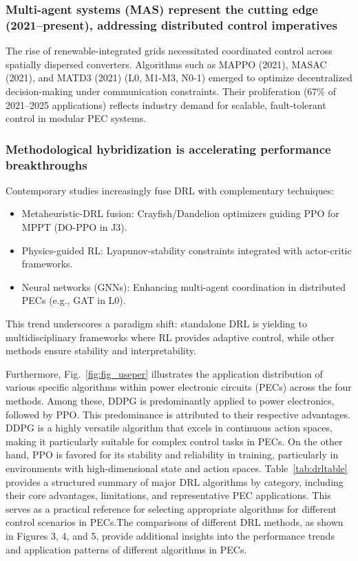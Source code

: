 \subsubsection{Multi-agent systems (MAS) represent the cutting edge (2021–present), addressing distributed control imperatives} The rise of renewable-integrated grids necessitated coordinated control across spatially dispersed converters. Algorithms such as MAPPO (2021), MASAC (2021), and MATD3 (2021) (L0, M1-M3, N0-1) emerged to optimize decentralized decision-making under communication constraints. Their proliferation (67\% of 2021–2025 applications) reflects industry demand for scalable, fault-tolerant control in modular PEC systems. 

\subsubsection{Methodological hybridization is accelerating performance breakthroughs} Contemporary studies increasingly fuse DRL with complementary techniques:
\begin{itemize}

  \item[$\bullet$] Metaheuristic-DRL fusion: Crayfish/Dandelion optimizers guiding PPO for MPPT (DO-PPO in J3).

  \item[$\bullet$] Physics-guided RL: Lyapunov-stability constraints integrated with actor-critic frameworks.

  \item[$\bullet$] Neural networks (GNNs): Enhancing multi-agent coordination in distributed PECs (e.g., GAT in L0).

\end{itemize}

This trend underscores a paradigm shift: standalone DRL is yielding to multidisciplinary frameworks where RL provides adaptive control, while other methods ensure stability and interpretability.

Furthermore, Fig.~\ref{fig:fig_useper} illustrates the application distribution of various specific algorithms within power electronic circuits (PECs) across the four methods. Among these, DDPG is predominantly applied to power electronics, followed by PPO. This predominance is attributed to their respective advantages. DDPG is a highly versatile algorithm that excels in continuous action spaces, making it particularly suitable for complex control tasks in PECs. On the other hand, PPO is favored for its stability and reliability in training, particularly in environments with high-dimensional state and action spaces. Table~\ref{tab:drltable} provides a structured summary of major DRL algorithms by category, including their core advantages, limitations, and representative PEC applications. This serves as a practical reference for selecting appropriate algorithms for different control scenarios in PECs.The comparisons of different DRL methods, as shown in Figures 3, 4, and 5, provide additional insights into the performance trends and application patterns of different algorithms in PECs.

